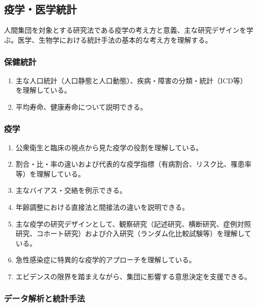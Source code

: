 \hypertarget{ux75abux5b66ux533bux5b66ux7d71ux8a08}{%
\subsection{疫学・医学統計}\label{ux75abux5b66ux533bux5b66ux7d71ux8a08}}

人間集団を対象とする研究法である疫学の考え方と意義、主な研究デザインを学ぶ。医学、生物学における統計手法の基本的な考え方を理解する。

\hypertarget{ux4fddux5065ux7d71ux8a08}{%
\subsubsection{保健統計}\label{ux4fddux5065ux7d71ux8a08}}

\begin{enumerate}
\def\labelenumi{\arabic{enumi}.}
\tightlist
\item
  主な人口統計（人口静態と人口動態）、疾病・障害の分類・統計（ICD等）を理解している。
\item
  平均寿命、健康寿命について説明できる。
\end{enumerate}

\hypertarget{ux75abux5b66}{%
\subsubsection{疫学}\label{ux75abux5b66}}

\begin{enumerate}
\def\labelenumi{\arabic{enumi}.}
\tightlist
\item
  公衆衛生と臨床の視点から見た疫学の役割を理解している。
\item
  割合・比・率の違いおよび代表的な疫学指標（有病割合、リスク比、罹患率等）を理解している。
\item
  主なバイアス・交絡を例示できる。
\item
  年齢調整における直接法と間接法の違いを説明できる。
\item
  主な疫学の研究デザインとして、観察研究（記述研究、横断研究、症例対照研究、コホート研究）および介入研究（ランダム化比較試験等）を理解している。
\item
  急性感染症に特異的な疫学的アプローチを理解している。
\item
  エビデンスの限界を踏まえながら、集団に影響する意思決定を支援できる。
\end{enumerate}

\hypertarget{ux30c7ux30fcux30bfux89e3ux6790ux3068ux7d71ux8a08ux624bux6cd5}{%
\subsubsection{データ解析と統計手法}\label{ux30c7ux30fcux30bfux89e3ux6790ux3068ux7d71ux8a08ux624bux6cd5}}

